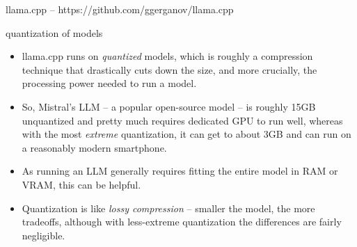 \documentclass{beamer}
\begin{document}
\begin{frame}[plain]
\end{frame}



\begin{frame}
	llama.cpp -- https://github.com/ggerganov/llama.cpp
\end{frame}

\begin{frame}{quantization of models}
	\begin{itemize}
		\item llama.cpp runs on \textit{quantized} models, which is roughly a compression technique that drastically cuts down the size, and more crucially, the processing power needed to run a model.
		\pause
		\item So, Mistral's LLM -- a popular open-source model -- is roughly 15GB unquantized and pretty much requires dedicated GPU to run well, whereas with the most \textit{extreme} quantization, it can get to about 3GB and can run on a reasonably modern smartphone.
		\pause
		\item As running an LLM generally requires fitting the entire model in RAM or VRAM, this can be helpful.
		\pause 
		\item Quantization is like \textit{lossy compression} -- smaller the model, the more tradeoffs, although with less-extreme quantization the differences are fairly negligible.
	\end{itemize}
	
\end{frame}
\end{document}
